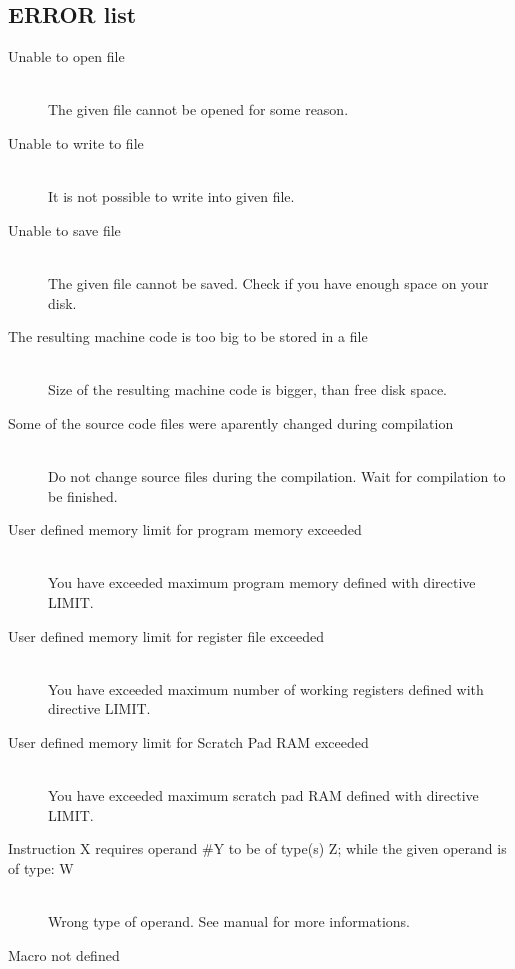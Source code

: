                 \subsection{ERROR list}
                    \begin{description}
                    \item[Unable to open file] \hfill \\
                    The given file cannot be opened for some reason.
                    \item[Unable to write to file] \hfill \\
                    It is not possible to write into given file.
                    \item[Unable to save file] \hfill \\
                    The given file cannot be saved. Check if you have enough space on your disk.
                    \item[The resulting machine code is too big to be stored in a file]\hfill \\
                    Size of the resulting machine code is bigger, than free disk space.
                    \item[Some of the source code files were aparently changed during compilation]\hfill \\
                    Do not change source files during the compilation. Wait for compilation to be finished.
                    \item[User defined memory limit for program memory exceeded]\hfill \\
                    You have exceeded maximum program memory defined with directive LIMIT.
                    \item[User defined memory limit for register file exceeded]\hfill \\
                    You have exceeded maximum number of working registers defined with directive LIMIT.
                    \item[User defined memory limit for Scratch Pad RAM exceeded]\hfill \\
                    You have exceeded maximum scratch pad RAM defined with directive LIMIT.
                    \item[Instruction X requires operand \#Y to be of type(s) Z; while the given operand is of type: W] \hfill \\   %
                    Wrong type of operand. See manual for more informations.
                    \item[Macro not defined ] \hfill \\

\end{description}
